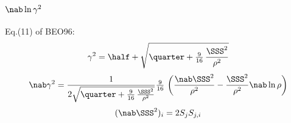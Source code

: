 \documentclass[twocolumn]{article}
\title{}
\author{}
\date{\today,~ $ $Revision: 1.95 $ $}
\begin{document}

\section{$\nab\ln\gamma^2$}

Eq.(11) of BEO96:
\begin{equation}
\gamma^2=\half+\sqrt{\quarter+{\textstyle{9\over16}}\,{\SSS^2\over\rho^2}}
\end{equation}
\begin{equation}
\nab\gamma^2={1\over2\sqrt{\quarter+{\textstyle{9\over16}}\,{\SSS^2\over\rho^2}}}{\textstyle{9\over16}}\,
\left({\nab\SSS^2\over\rho^2}-{\SSS^2\over\rho^2}\nab\ln\rho\right)
\end{equation}
\begin{equation}
(\nab\SSS^2)_i=2S_j S_{j,i}
\end{equation}









\end{document}
